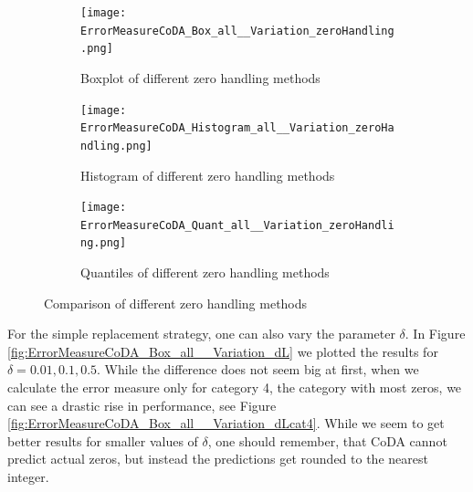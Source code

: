 \begin{figure}[htb!]
\centering
\begin{subfigure}[b]{0.45\textwidth}
\texttt{[image: ErrorMeasureCoDA\_Box\_all\_\_Variation\_zeroHandling.png]}
\caption{Boxplot of different zero handling methods}
\label{fig:Coda zero handling Box}
\end{subfigure}
\hfill
\begin{subfigure}[b]{0.45\textwidth}
\texttt{[image: ErrorMeasureCoDA\_Histogram\_all\_\_Variation\_zeroHandling.png]}
\caption{Histogram of different zero handling methods}
\label{fig:Coda zero handling Hist}
\end{subfigure}
\hfill
\begin{subfigure}[b]{0.8\textwidth}
\texttt{[image: ErrorMeasureCoDA\_Quant\_all\_\_Variation\_zeroHandling.png]}
\caption{Quantiles of different zero handling methods}
\label{fig:Coda zero handling Quant}
\end{subfigure}
\caption{Comparison of different zero handling methods}
\label{fig:Coda zero handling Comp1}
\end{figure}

For the simple replacement strategy, one can also vary the parameter $\delta$. In Figure \ref{fig:ErrorMeasureCoDA_Box_all__Variation_dL} we plotted the results for $\delta=0.01,0.1,0.5$. While the difference does not seem big at first, when we calculate the error measure only for category 4, the category with most zeros, we can see a drastic rise in performance, see Figure \ref{fig:ErrorMeasureCoDA_Box_all__Variation_dLcat4}. While we seem to get better results for smaller values of $\delta$, one should remember, that CoDA cannot predict actual zeros, but instead the predictions get rounded to the nearest integer. 



